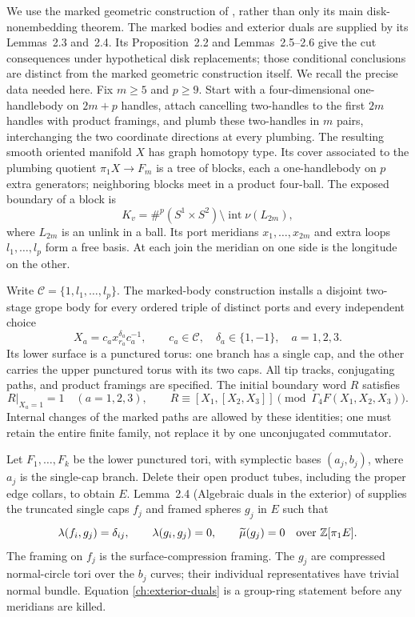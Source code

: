 We use the marked geometric construction of \cite[Section~2]{TO}, rather
than only its main disk-nonembedding theorem. The marked bodies and
exterior duals are supplied by its Lemmas~2.3 and~2.4. Its
Proposition~2.2 and Lemmas~2.5--2.6 give the cut consequences under
hypothetical disk replacements; those conditional conclusions are
distinct from the marked geometric construction itself.
We recall the precise data needed here.
Fix $m\geq5$ and $p\geq9$.  Start with a four-dimensional one-handlebody
on $2m+p$ handles, attach cancelling two-handles to the first $2m$
handles with product framings, and plumb these two-handles in $m$ pairs,
interchanging the two coordinate directions at every plumbing.
The resulting smooth oriented manifold $X$ has graph homotopy type.
Its cover associated to the plumbing quotient $\pi_1X\to F_m$ is a
tree of blocks, each a one-handlebody on $p$ extra generators; neighboring
blocks meet in a product four-ball.  The exposed boundary of a block is
\[
 K_v=\#^p(S^1\times S^2)\setminus
       \operatorname{int}\nu(L_{2m}),
\]
where $L_{2m}$ is an unlink in a ball.  Its port meridians
$x_1,\ldots,x_{2m}$ and extra loops $l_1,\ldots,l_p$ form a free basis.
At each join the meridian on one side is the longitude on the other.

Write $\mathcal C=\{1,l_1,\ldots,l_p\}$.  The marked-body construction
installs a disjoint two-stage grope body for every ordered triple of
distinct ports and every independent choice
\[
 X_a=c_a x_{r_a}^{\delta_a}c_a^{-1},\qquad
 c_a\in\mathcal C,\quad \delta_a\in\{1,-1\},\quad a=1,2,3.
\]
Its lower surface is a punctured torus: one branch has a single cap,
and the other carries the upper punctured torus with its two caps.
All tip tracks, conjugating paths, and product framings are specified.
The initial boundary word $R$ satisfies
\begin{equation}
\label{ch:laws}
 R|_{X_a=1}=1\quad(a=1,2,3),\qquad
 R\equiv[X_1,[X_2,X_3]]\pmod{\Gamma_4F(X_1,X_2,X_3)}.
\end{equation}
Internal changes of the marked paths are allowed by these identities;
one must retain the entire finite family, not replace it by one
unconjugated commutator.

Let $F_1,\ldots,F_k$ be the lower punctured tori, with symplectic bases
$(a_j,b_j)$, where $a_j$ is the single-cap branch.  Delete their open
product tubes, including the proper edge collars, to obtain $E$.
Lemma~2.4 (Algebraic duals in the exterior) of \cite{TO} supplies
the truncated single caps $f_j$ and framed spheres $g_j$ in $E$ such
that
\begin{equation}
\label{ch:exterior-duals}
 \lambda(f_i,g_j)=\delta_{ij},\qquad
 \lambda(g_i,g_j)=0,\qquad \widetilde\mu(g_j)=0
 \quad\text{over }\mathbb Z[\pi_1E].
\end{equation}
The framing on $f_j$ is the surface-compression framing.  The $g_j$
are compressed normal-circle tori over the $b_j$ curves; their
individual representatives have trivial normal bundle.  Equation
\eqref{ch:exterior-duals} is a group-ring statement before any
meridians are killed.

